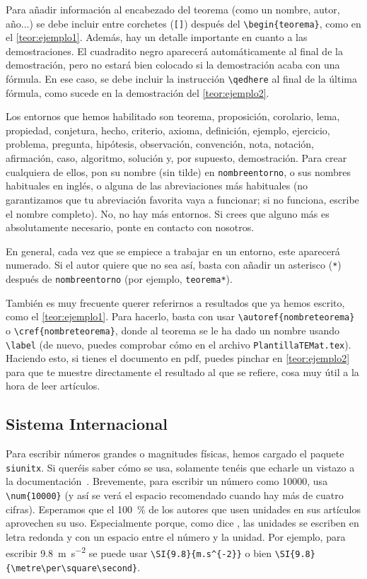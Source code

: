 \documentclass[bibtex, anon]{TEMat-article}
\begin{document}
Para añadir información al encabezado del teorema (como un nombre, autor, año...) se debe incluir entre corchetes (\verb+[]+) después del \verb+\begin{teorema}+, como en el \autoref{teor:ejemplo1}.
Además, hay un detalle importante en cuanto a las demostraciones.
El cuadradito negro aparecerá automáticamente al final de la demostración, pero no estará bien colocado si la demostración acaba con una fórmula.
En ese caso, se debe incluir la instrucción \verb+\qedhere+ al final de la última fórmula, como sucede en la demostración del \autoref{teor:ejemplo2}.

Los entornos que hemos habilitado son teorema, proposición, corolario, lema, propiedad, conjetura, hecho, criterio, axioma, definición, ejemplo, ejercicio, problema, pregunta, hipótesis, observación, convención, nota, notación, afirmación, caso, algoritmo, solución y, por supuesto, demostración.
Para crear cualquiera de ellos, pon su nombre (sin tilde) en \verb+nombreentorno+, o sus nombres habituales en inglés, o alguna de las abreviaciones más habituales (no garantizamos que tu abreviación favorita vaya a funcionar; si no funciona, escribe el nombre completo).
No, no hay más entornos.
Si crees que alguno más es absolutamente necesario, ponte en contacto con nosotros.

En general, cada vez que se empiece a trabajar en un entorno, este aparecerá numerado.
Si el autor quiere que no sea así, basta con añadir un asterisco (\verb+*+) después de \verb+nombreentorno+ (por ejemplo, \verb+teorema*+).

También es muy frecuente querer referirnos a resultados que ya hemos escrito, como el \autoref{teor:ejemplo1}. Para hacerlo, basta con usar \verb+\autoref{nombreteorema}+ o \verb+\cref{nombreteorema}+, donde al teorema se le ha dado un nombre usando \verb+\label+ (de nuevo, puedes comprobar cómo en el archivo \verb+PlantillaTEMat.tex+).
Haciendo esto, si tienes el documento en pdf, puedes pinchar en \autoref{teor:ejemplo2} para que te muestre directamente el resultado al que se refiere, cosa muy útil a la hora de leer artículos.

\subsection{Sistema Internacional}

Para escribir números grandes o magnitudes físicas, hemos cargado el paquete \verb+siunitx+.
Si queréis saber cómo se usa, solamente tenéis que echarle un vistazo a la documentación~\cite{siunitx}.
Brevemente, para escribir un número como \num{10000}, usa \verb+\num{10000}+ (y así se verá el espacio recomendado cuando hay más de cuatro cifras).
Esperamos que el \SI{100}{\percent} de los autores que usen unidades en sus artículos aprovechen su uso.
Especialmente porque, como dice \citet{bezosOM}, las unidades se escriben en letra redonda y con un espacio entre el número y la unidad.
Por ejemplo, para escribir \SI{9.8}{m.s^{-2}} se puede usar \verb+\SI{9.8}{m.s^{-2}}+ o bien \verb+\SI{9.8}{\metre\per\square\second}+.
\end{document}
